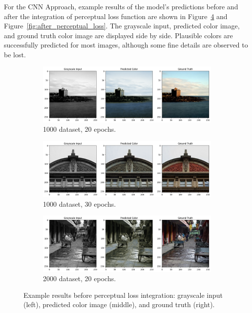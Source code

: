 \documentclass[conference]{IEEEtran}
\begin{document}
For the CNN Approach, example results of the model's predictions before and after the integration of perceptual loss function are shown in Figure~\ref{fig:before_perceptual_loss} and Figure~\ref{fig:after_perceptual_loss}. The grayscale input, predicted color image, and ground truth color image are displayed side by side. Plausible colors are successfully predicted for most images, although some fine details are observed to be lost.

\begin{figure}[t]
    \centering
    \begin{subfigure}{\columnwidth}
        \centering
        \includegraphics[width=\linewidth]{1_1000dataset_epochs20_result.png}
        \caption{1000 dataset, 20 epochs.}
        \label{fig:1000_20}
    \end{subfigure}
    \hfill
    \begin{subfigure}{\columnwidth}
        \centering
        \includegraphics[width=\linewidth]{2_1000dataset_epochs30_result.png}
        \caption{1000 dataset, 30 epochs.}
        \label{fig:1000_30}
    \end{subfigure}
    \hfill
    \begin{subfigure}{\columnwidth}
        \centering
        \includegraphics[width=\linewidth]{4_2000dataset_epochs20_result.png}
        \caption{2000 dataset, 20 epochs.}
        \label{fig:2000_20}
    \end{subfigure}

    \caption{Example results before perceptual loss integration: grayscale input (left), predicted color image (middle), and ground truth (right).}
    \label{fig:before_perceptual_loss}
\end{figure}
\end{document}
